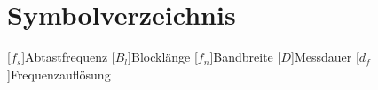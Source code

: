 \chapter*{Symbolverzeichnis}
\begin{acronym}[BreiteDerLinkenSpalte]

[$f_s$]{Abtastfrequenz}
[$B_l$]{Blocklänge}
[$f_n$]{Bandbreite}
[$D$]{Messdauer}
[$d_f$]{Frequenzauflösung}
\end{acronym}